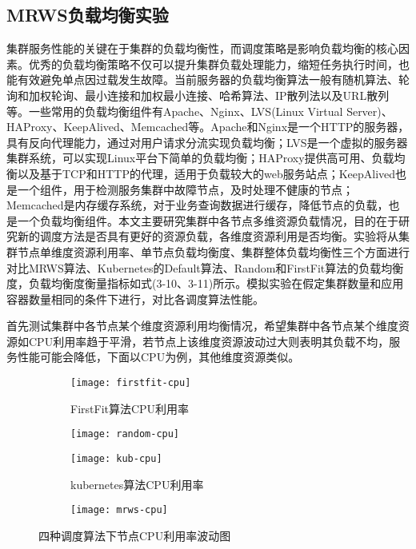 \subsection{MRWS负载均衡实验}
集群服务性能的关键在于集群的负载均衡性，而调度策略是影响负载均衡的核心因素。优秀的负载均衡策略不仅可以提升集群负载处理能力，缩短任务执行时间，也能有效避免单点因过载发生故障。当前服务器的负载均衡算法一般有随机算法、轮询和加权轮询、最小连接和加权最小连接、哈希算法、IP散列法以及URL散列等。一些常用的负载均衡组件有Apache、Nginx、LVS(Linux Virtual Server)、HAProxy、KeepAlived、Memcached等。Apache和Nginx是一个HTTP的服务器，具有反向代理能力，通过对用户请求分流实现负载均衡；LVS是一个虚拟的服务器集群系统，可以实现Linux平台下简单的负载均衡；HAProxy提供高可用、负载均衡以及基于TCP和HTTP的代理，适用于负载较大的web服务站点；KeepAlived也是一个组件，用于检测服务集群中故障节点，及时处理不健康的节点；Memcached是内存缓存系统，对于业务查询数据进行缓存，降低节点的负载，也是一个负载均衡组件。本文主要研究集群中各节点多维资源负载情况，目的在于研究新的调度方法是否具有更好的资源负载，各维度资源利用是否均衡。实验将从集群节点单维度资源利用率、单节点负载均衡度、集群整体负载均衡性三个方面进行对比MRWS算法、Kubernetes的Default算法、Random和FirstFit算法的负载均衡度，负载均衡度衡量指标如式(3-10、3-11)所示。模拟实验在假定集群数量和应用容器数量相同的条件下进行，对比各调度算法性能。

首先测试集群中各节点某个维度资源利用均衡情况，希望集群中各节点某个维度资源如CPU利用率趋于平滑，若节点上该维度资源波动过大则表明其负载不均，服务性能可能会降低，下面以CPU为例，其他维度资源类似。
\begin{figure}[h]
	\centering%
	\begin{subfigure}{7cm}
		\texttt{[image: firstfit-cpu]}
		\caption{FirstFit算法CPU利用率}
	\end{subfigure}%
	\hspace{0.5cm}%
	\begin{subfigure}{7cm}
		\texttt{[image: random-cpu]}
	\end{subfigure}
	\begin{subfigure}{7cm}
		\texttt{[image: kub-cpu]}
		\caption{kubernetes算法CPU利用率}
	\end{subfigure}%
	\hspace{0.5cm}%
	\begin{subfigure}{7cm}
		\texttt{[image: mrws-cpu]}
	\end{subfigure}
	\caption{四种调度算法下节点CPU利用率波动图}
	
\end{figure}

